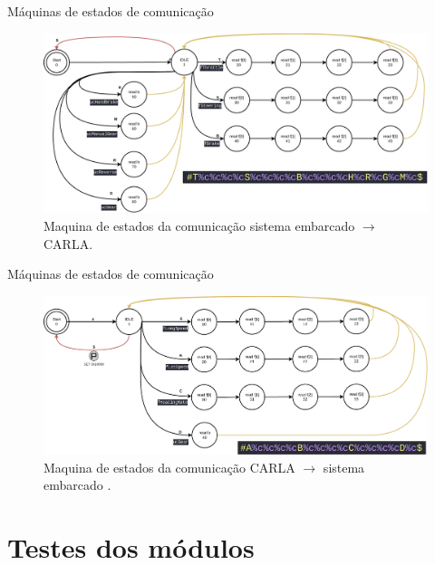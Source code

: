 \documentclass{if-beamer}
\begin{document}
\begin{frame}{Máquinas de estados de comunicação}
	
	\begin{figure}[H]
		\centering
		\includegraphics[width=\linewidth]{sm_uc_2_carla}
		\caption{Maquina de estados da comunicação sistema embarcado $\longrightarrow$ CARLA.}
		\label{fig:sm_uc_2_carla}
	\end{figure}
	
\end{frame}

\begin{frame}{Máquinas de estados de comunicação}
	
	\begin{figure}[H]
		\centering
		\includegraphics[width=\linewidth]{sm_carla_2_uc}
		\caption{Maquina de estados da comunicação CARLA $\longrightarrow$ sistema embarcado .}
		\label{fig:sm_carla_2_uc}
	\end{figure}

\end{frame}


\section{Testes dos módulos}
\end{document}
